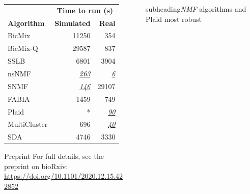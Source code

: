 \documentclass[xcolor=table,final]{beamer}
\newlength{\sepwid}
\newlength{\onecolwid}
\newlength{\twocolwid}
\newcommand{\runnerup}[1] {\underline{\textit{#1}}}
\newcommand{\kcnsubheading}[1]{\begin{beamercolorbox}[rounded=true]{subheading}{\large #1}\end{beamercolorbox}}
\begin{document}
\begin{frame}[t]
\begin{columns}[t]
\begin{column}{\twocolwid}
\begin{columns}
\begin{column}{\onecolwid}
\begin{table}[t!]
\begin{tabular}{ l | r | r }
    & \multicolumn{2}{c}{\textbf{Time to run (s)}} \\
    \textbf{Algorithm} & \textbf{Simulated} & \textbf{Real} \\ \hline
\cellcolor[HTML]{C50F11}\color[HTML]{FFFFFF}BicMix & 11250 & 354 \\
\cellcolor[HTML]{C50F11}\color[HTML]{FFFFFF}BicMix-Q & 29587 & 837 \\
\cellcolor[HTML]{C50F11}\color[HTML]{FFFFFF}SSLB & 6801 & 3904 \\ \hline
\cellcolor[HTML]{3B93DC}\color[HTML]{FFFFFF}nsNMF & \runnerup{263} & \runnerup{6} \\
\cellcolor[HTML]{3B93DC}\color[HTML]{FFFFFF}SNMF & \runnerup{146} & 29107 \\ \hline
\cellcolor[HTML]{50bd4c}\color[HTML]{FFFFFF}FABIA & 1459 & 749 \\
\cellcolor[HTML]{50bd4c}\color[HTML]{FFFFFF}Plaid & * & \runnerup{90} \\ \hline
\cellcolor[HTML]{7f1c8e}\color[HTML]{FFFFFF}MultiCluster & 696 & \runnerup{40} \\
\cellcolor[HTML]{7f1c8e}\color[HTML]{FFFFFF}SDA & 4746 & 3330 \\

\end{tabular}
\end{table}

\begin{alertblock}{Preprint}
For full details, see the preprint on bioRxiv: \\
\small \url{https://doi.org/10.1101/2020.12.15.422852}
\end{alertblock}


\end{column} %
\end{columns} %


\end{column} %

\begin{column}{\sepwid}\end{column} %
\begin{column}{\onecolwid} %


\kcnsubheading{\textit{NMF} algorithms and Plaid most robust}


\end{column}
\end{columns}
\end{frame}
\end{document}
